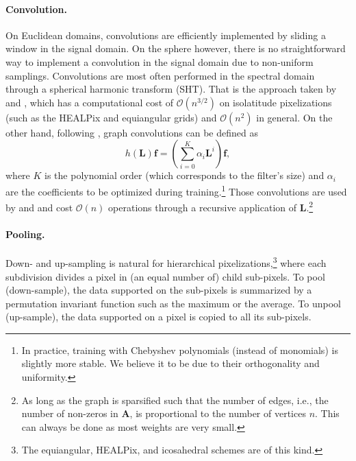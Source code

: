 \documentclass{article} %
\renewcommand{\b}[1]{{\bm{#1}}}  %
\newcommand{\bO}{\mathcal{O}}
\begin{document}
\paragraph{Convolution.}
On Euclidean domains, convolutions are efficiently implemented by sliding a window in the signal domain.
On the sphere however, there is no straightforward way to implement a convolution in the signal domain due to non-uniform samplings.
Convolutions are most often performed in the spectral domain through a spherical harmonic transform (SHT).
That is the approach taken by \citet{cohen2018sphericalcnn} and \citet{esteves2018sphericalcnn}, which has a computational cost of $\bO(n^{3/2})$ on isolatitude pixelizations (such as the HEALPix and equiangular grids) and $\bO(n^2)$ in general.
On the other hand, following \citet{defferrard2016graphnn}, graph convolutions can be defined as
\begin{equation} \label{eqn:graph_conv}
	h(\b{L}) \b{f} = \left(\sum_{i=0}^K \alpha_i \b{L}^i\right) \b{f},
\end{equation}
where $K$ is the polynomial order (which corresponds to the filter's size) and $\alpha_i$ are the coefficients to be optimized during training.\footnote{In practice, training with Chebyshev polynomials (instead of monomials) is slightly more stable. We believe it to be due to their orthogonality and uniformity.}
Those convolutions are used by \citet{khasanova2017sphericalcnn} and \citet{perraudin2019deepspherecosmo} and cost $\bO(n)$ operations through a recursive application of $\b{L}$.\footnote{As long as the graph is sparsified such that the number of edges, i.e., the number of non-zeros in $\b{A}$, is proportional to the number of vertices $n$. This can always be done as most weights are very small.}

\paragraph{Pooling.}
Down- and up-sampling is natural for hierarchical pixelizations,\footnote{The equiangular, HEALPix, and icosahedral schemes are of this kind.} where each subdivision divides a pixel in (an equal number of) child sub-pixels.
To pool (down-sample), the data supported on the sub-pixels is summarized by a permutation invariant function such as the maximum or the average.
To unpool (up-sample), the data supported on a pixel is copied to all its sub-pixels.
\end{document}
